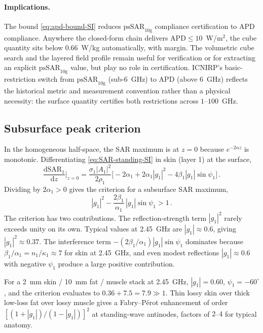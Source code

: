 \documentclass[journal,twocolumn,10pt]{IEEEtran}
\theoremstyle{plain}
\theoremstyle{remark}
\newcommand{\APD}{\mathrm{APD}}
\newcommand{\diff}{\mathrm{d}}
\begin{document}
\paragraph{Implications.}
The bound \eqref{eq:apd-bound-SI} reduces $\mathrm{psSAR}_{10\mathrm{g}}$
compliance certification to $\APD$ compliance. Anywhere the
closed-form chain delivers $\APD \le 10$~W/m$^2$, the cube quantity
sits below $0.66$~W/kg automatically, with margin. The volumetric
cube search and the layered field profile remain useful for
verification or for extracting an explicit
$\mathrm{psSAR}_{10\mathrm{g}}$ value, but play no role in
certification. ICNIRP's basic-restriction switch from
$\mathrm{psSAR}_{10\mathrm{g}}$ (sub-$6$~GHz) to $\APD$ (above
$6$~GHz) reflects the historical metric and measurement convention
rather than a physical necessity: the surface quantity certifies both
restrictions across $1$--$100$~GHz.

\subsection{Subsurface peak criterion}
In the homogeneous half-space, the SAR maximum is at $z = 0$
because $e^{-2\alpha z}$ is monotonic. Differentiating
\eqref{eq:SAR-standing-SI} in skin (layer 1) at the surface,
\begin{equation}\label{eq:dSAR-dz-SI}
  \frac{\diff\mathrm{SAR}_1}{\diff z}\bigg|_{z=0}
  = \frac{\sigma_1 |A_1|^2}{2\rho_1}
  \bigl[-2\alpha_1 + 2\alpha_1|g_1|^2 - 4\beta_1|g_1|\sin\psi_1\bigr]\, .
\end{equation}
Dividing by $2\alpha_1 > 0$ gives the criterion for a subsurface
SAR maximum,
\begin{equation}\label{eq:subsurface-criterion-SI}
  |g_1|^2 - \frac{2\beta_1}{\alpha_1}\,|g_1|\sin\psi_1 > 1\, .
\end{equation}
The criterion has two contributions. The reflection-strength term
$|g_1|^2$ rarely exceeds unity on its own. Typical values at
2.45~GHz are $|g_1| \approx 0.6$, giving $|g_1|^2 \approx 0.37$.
The interference term $-(2\beta_1/\alpha_1)|g_1|\sin\psi_1$
dominates because $\beta_1/\alpha_1 = n_1/\kappa_1 \approx 7$ for
skin at 2.45~GHz, and even modest reflections $|g_1| \approx 0.6$
with negative $\psi_1$ produce a large positive contribution.

For a 2~mm skin / 10~mm fat / muscle stack at 2.45~GHz,
$|g_1| = 0.60$, $\psi_1 = -60^\circ$, and the criterion evaluates
to $0.36 + 7.5 = 7.9 \gg 1$. Thin lossy skin over thick low-loss
fat over lossy muscle gives a Fabry--P\'erot enhancement of order
$[(1+|g_1|)/(1-|g_1|)]^2$ at standing-wave antinodes, factors of
$2$--$4$ for typical anatomy.
\end{document}
